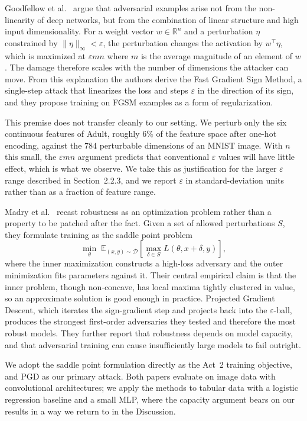\documentclass[11pt]{article}
\begin{document}
Goodfellow et al.\ \cite{goodfellow2015} argue that adversarial examples arise not
from the non-linearity of deep networks, but from the combination of linear
structure and high input dimensionality. For a weight vector $w \in \mathbb{R}^n$
and a perturbation $\eta$ constrained by $\|\eta\|_\infty < \varepsilon$, the
perturbation changes the activation by $w^\top \eta$, which is maximized at
$\varepsilon m n$ where $m$ is the average magnitude of an element of $w$. The
damage therefore scales with the number of dimensions the attacker can move. From
this explanation the authors derive the Fast Gradient Sign Method, a single-step
attack that linearizes the loss and steps $\varepsilon$ in the direction of its
sign, and they propose training on FGSM examples as a form of regularization.

This premise does not transfer cleanly to our setting. We perturb only the six
continuous features of Adult, roughly $6\%$ of the feature space after one-hot
encoding, against the $784$ perturbable dimensions of an MNIST image. With $n$ this
small, the $\varepsilon m n$ argument predicts that conventional $\varepsilon$
values will have little effect, which is what we observe. We take this as
justification for the larger $\varepsilon$ range described in Section~2.2.3, and we
report $\varepsilon$ in standard-deviation units rather than as a fraction of
feature range.

Madry et al.\ \cite{madry2018} recast robustness as an optimization problem rather
than a property to be patched after the fact. Given a set of allowed perturbations
$S$, they formulate training as the saddle point problem
$$\min_\theta \; \mathbb{E}_{(x,y) \sim \mathcal{D}} \left[ \max_{\delta \in S}
L(\theta, x + \delta, y) \right],$$
where the inner maximization constructs a high-loss adversary and the outer
minimization fits parameters against it. Their central empirical claim is that the
inner problem, though non-concave, has local maxima tightly clustered in value, so
an approximate solution is good enough in practice. Projected Gradient Descent,
which iterates the sign-gradient step and projects back into the $\varepsilon$-ball,
produces the strongest first-order adversaries they tested and therefore the most
robust models. They further report that robustness depends on model capacity, and
that adversarial training can cause insufficiently large models to fail outright.

We adopt the saddle point formulation directly as the Act~2 training objective, and
PGD as our primary attack. Both papers evaluate on image data with convolutional
architectures; we apply the methods to tabular data with a logistic regression
baseline and a small MLP, where the capacity argument bears on our results in a way
we return to in the Discussion.
\end{document}
